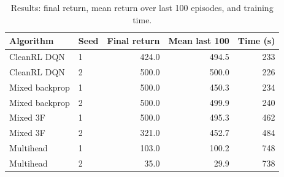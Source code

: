 \begin{table}[ht]
\centering
\caption{Results: final return, mean return over last 100 episodes, and training time.}
\label{tab:results}
\begin{tabular}{llrrr}
\toprule
Algorithm & Seed & Final return & Mean last 100 & Time (s) \\
\midrule
CleanRL DQN & 1 & 424.0 & 494.5 & 233 \\
CleanRL DQN & 2 & 500.0 & 500.0 & 226 \\
Mixed backprop & 1 & 500.0 & 450.3 & 234 \\
Mixed backprop & 2 & 500.0 & 499.9 & 240 \\
Mixed 3F & 1 & 500.0 & 495.3 & 462 \\
Mixed 3F & 2 & 321.0 & 452.7 & 484 \\
Multihead & 1 & 103.0 & 100.2 & 748 \\
Multihead & 2 & 35.0 & 29.9 & 738 \\
\bottomrule
\end{tabular}
\end{table}
